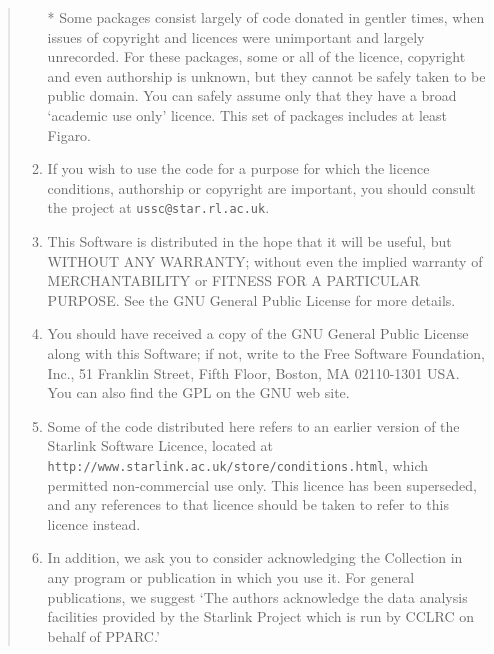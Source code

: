 \documentclass[twoside,11pt]{article}
\newcommand{\htmladdnormallink}[2]{#1}
\renewcommand{\_}{\texttt{\symbol{95}}}
\begin{document}
\begin{quote}
\begin{enumerate}
  * Some packages consist largely of code donated in gentler times,
    when issues of copyright and licences were unimportant and
    largely unrecorded.  For these packages, some or all of the
    licence, copyright and even authorship is unknown, but they
    cannot be safely taken to be public domain.  You can safely
    assume only that they have a broad `academic use only' licence.
    This set of packages includes at least Figaro.

\item If you wish to use the code for a purpose for which the licence
 conditions, authorship or copyright are important, you should
 consult the project at \texttt{ussc@star.rl.ac.uk}.

\item This Software is distributed in the hope that it will be useful, but
 WITHOUT ANY WARRANTY; without even the implied warranty of
 MERCHANTABILITY or FITNESS FOR A PARTICULAR PURPOSE. See the GNU General
 Public License for more details.

\item You should have received a copy of the GNU General Public License along
 with this Software; if not, write to the Free Software Foundation, Inc.,
 51 Franklin Street, Fifth Floor, Boston, MA 02110-1301 USA. You can also find
 the GPL on the GNU web site.

\item Some of the code distributed here refers to an earlier version of
 the Starlink Software Licence, located at
 \htmladdnormallink{\texttt{http://www.starlink.ac.uk/store/conditions.html}}{http://www.starlink.ac.uk/store/conditions.html},
 which permitted non-commercial use only.  This licence has been
 superseded, and any references to that licence should be taken to
 refer to this licence instead.

\item In addition, we ask you to consider acknowledging the Collection in any
 program or publication in which you use it.  For general publications,
 we suggest `The authors acknowledge the data analysis facilities
 provided by the Starlink Project which is run by CCLRC on behalf
 of PPARC.'
\end{enumerate}
\end{quote}
\end{document}
